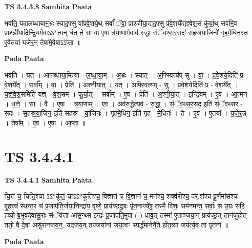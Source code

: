 \documentclass[17pt]{extarticle}
\begin{document}
\textbf{TS 3.4.3.8 } \newline
\textbf{Samhita Paata} \newline

भव॑ति॒ यदाल॑ब्धायाम॒भ्रः स्याद॒फ्सु वा᳚प्रवे॒शये॒थ् सर्वां᳚ ॅवा॒ प्राश्ञी॑या॒द्यद॒फ्सु प्र॑वे॒शये᳚द्यज्ञ्वेश॒सं कु॑र्या॒थ् सर्वा॑मे॒व प्राश्ञी॑यादिन्द्रि॒यमे॒वाऽऽ*त्मन् ध॑त् ते॒ सा वा ए॒षा त्र॑या॒णामे॒वाव॑ रुद्धा संॅवथ्सर॒सदः॑ सहस्रया॒जिनो॑ गृहमे॒धिन॒स्त ए॒वैतया॑ यजेर॒न् तेषा॑मे॒वैषाऽऽप्ता ॥ \newline

\textbf{Pada Paata} \newline

भव॑ति । यत् । आल॑ब्धाया॒मित्या - ल॒ब्धा॒या॒म् । अ॒भ्रः । स्यात् । अ॒फ्स्वित्य॑प्-सु । वा॒ । प्र॒वे॒शये॒दिति॑ प्र - वे॒शये᳚त् । सर्वा᳚म् । वा॒ । प्रेति॑ । अ॒श्नी॒या॒त् । यत् । अ॒फ्स्वित्य॑प् - सु । प्र॒वे॒शये॒दिति॑ प्र - वे॒शये᳚त् । य॒ज्ञ्॒वे॒श॒समिति॑ यज्ञ् - वे॒श॒सम् । कु॒र्या॒त् । सर्वा᳚म् । ए॒व । प्रेति॑ । अ॒श्नी॒या॒त् । इ॒न्द्रि॒यम् । ए॒व । आ॒त्मन् । ध॒त्ते॒ । सा । वै । ए॒षा । त्र॒या॒णाम् । ए॒व । अव॑रु॒द्धेत्यव॑ - रु॒द्धा॒ । सं॒ॅव॒थ्स॒र॒सद॒ इति॑ संॅवथ्सर - सदः॑ । स॒ह॒स्र॒या॒जिन॒ इति॑ सहस्र - या॒जिनः॑ । गृ॒ह॒मे॒धिन॒ इति॑ गृह - मे॒धिनः॑ । ते । ए॒व । ए॒तया᳚ । य॒जे॒र॒न्न् । तेषा᳚म् । ए॒व । ए॒षा । आ॒प्ता ॥  \newline




\section*{ TS 3.4.4.1 }

\textbf{TS 3.4.4.1 } \newline
\textbf{Samhita Paata} \newline

चि॒त्तं च॒ चित्ति॒श्चा ऽऽ*कू॑तं॒ चाऽऽ*कू॑तिश्च॒ विज्ञा॑तं च वि॒ज्ञानं॑ च॒ मन॑श्च॒ शक्व॑रीश्च॒ दर्.श॑श्च पू॒र्णमा॑सश्च बृ॒हच्च॑ रथन्त॒रं च॑ प्र॒जाप॑ति॒र्जया॒निन्द्रा॑य॒ वृष्णे॒ प्राय॑च्छदु॒ग्रः पृ॑त॒नाज्ये॑षु॒ तस्मै॒ विशः॒ सम॑नमन्त॒ सर्वाः॒ स उ॒ग्रः सहि हव्यो॑ ब॒भूव॑देवासु॒राः संॅय॑त्ता आस॒न्थ्स इन्द्रः॑ प्र॒जाप॑ति॒मुपा॑ ( ) धाव॒त् तस्मा॑ ए॒ताञ्जया॒न् प्राय॑च्छ॒त् तान॑जुहो॒त् ततो॒ वै दे॒वा असु॑रानजय॒न॒. यदज॑य॒न् तज्जया॑नां जय॒त्वꣳ स्पर्द्ध॑मानेनै॒ते हो॑त॒व्या॑ जय॑त्ये॒व तां पृत॑नां ॥ \newline

\textbf{Pada Paata} \newline
\end{document}
